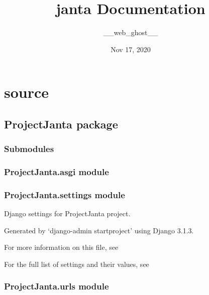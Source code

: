 \documentclass[letterpaper,10pt,english]{sphinxmanual}
\title{janta Documentation}
\date{Nov 17, 2020}
\author{\_\_web\_ghost\_\_}
\begin{document}
\pagestyle{empty}
\sphinxmaketitle
\pagestyle{plain}
\sphinxtableofcontents
\pagestyle{normal}
\label{\detokenize{index::doc}}



\chapter{source}
\label{\detokenize{modules:source}}\label{\detokenize{modules::doc}}

\section{ProjectJanta package}
\label{\detokenize{ProjectJanta:projectjanta-package}}\label{\detokenize{ProjectJanta::doc}}

\subsection{Submodules}
\label{\detokenize{ProjectJanta:submodules}}

\subsection{ProjectJanta.asgi module}
\label{\detokenize{ProjectJanta:projectjanta-asgi-module}}

\subsection{ProjectJanta.settings module}
\label{\detokenize{ProjectJanta:module-ProjectJanta.settings}}\label{\detokenize{ProjectJanta:projectjanta-settings-module}}
Django settings for ProjectJanta project.

Generated by ‘django-admin startproject’ using Django 3.1.3.

For more information on this file, see

For the full list of settings and their values, see


\subsection{ProjectJanta.urls module}
\label{\detokenize{ProjectJanta:projectjanta-urls-module}}
\end{document}
